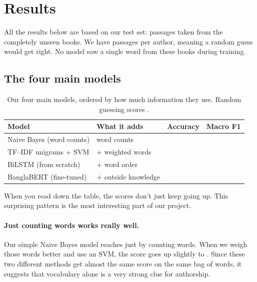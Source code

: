 
\section{Results}
\label{sec:results}

All the results below are based on our test set: \nTest{} passages taken from the \nUnseenBooks{} completely unseen books. We have \testPerAuthor{} passages per author, meaning a random guess would get \chanceAcc{} right. No model saw a single word from these books during training.

\subsection{The four main models}

\begin{table}[H]
\centering\small
\caption{Our four main models, ordered by how much information they use. Random guessing scores \chanceAcc{}.}
\label{tab:main}
\begin{tabular}{llrr}
\toprule
\textbf{Model} & \textbf{What it adds} & \textbf{Accuracy} & \textbf{Macro F1} \\
\midrule
Naive Bayes (word counts)   & word counts            & \naiveBayesAcc{}    & \naiveBayesFone{} \\
TF--IDF unigrams + SVM   & $+$ weighted words     & \tfidfBaselineAcc{} & \tfidfBaselineFone{} \\
BiLSTM (from scratch)    & $+$ word order         & \bilstmAcc{}        & \bilstmFone{} \\
BanglaBERT (fine-tuned)  & $+$ outside knowledge  & \bertFTAcc{}      & \bertFTFone{} \\
\bottomrule
\end{tabular}
\end{table}

When you read down the table, the scores don't just keep going up. This surprising pattern is the most interesting part of our project.

\paragraph{Just counting words works really well.} Our simple Naive Bayes model reaches \naiveBayesAcc{} just by counting words. When we weigh those words better and use an SVM, the score goes up slightly to \tfidfBaselineAcc{}. Since these two different methods get almost the same score on the same bag of words, it suggests that vocabulary alone is a very strong clue for authorship.


